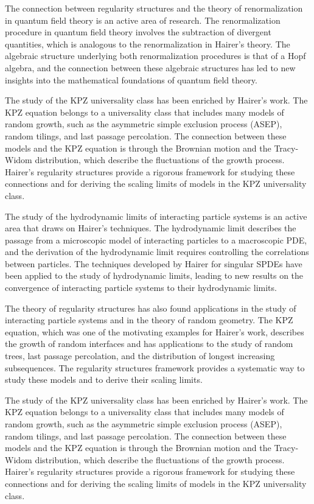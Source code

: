 The connection between regularity structures and the theory of renormalization in quantum field theory is an active area of research. The renormalization procedure in quantum field theory involves the subtraction of divergent quantities, which is analogous to the renormalization in Hairer's theory. The algebraic structure underlying both renormalization procedures is that of a Hopf algebra, and the connection between these algebraic structures has led to new insights into the mathematical foundations of quantum field theory.

The study of the KPZ universality class has been enriched by Hairer's work. The KPZ equation belongs to a universality class that includes many models of random growth, such as the asymmetric simple exclusion process (ASEP), random tilings, and last passage percolation. The connection between these models and the KPZ equation is through the Brownian motion and the Tracy-Widom distribution, which describe the fluctuations of the growth process. Hairer's regularity structures provide a rigorous framework for studying these connections and for deriving the scaling limits of models in the KPZ universality class.

The study of the hydrodynamic limits of interacting particle systems is an active area that draws on Hairer's techniques. The hydrodynamic limit describes the passage from a microscopic model of interacting particles to a macroscopic PDE, and the derivation of the hydrodynamic limit requires controlling the correlations between particles. The techniques developed by Hairer for singular SPDEs have been applied to the study of hydrodynamic limits, leading to new results on the convergence of interacting particle systems to their hydrodynamic limits.

The theory of regularity structures has also found applications in the study of interacting particle systems and in the theory of random geometry. The KPZ equation, which was one of the motivating examples for Hairer's work, describes the growth of random interfaces and has applications to the study of random trees, last passage percolation, and the distribution of longest increasing subsequences. The regularity structures framework provides a systematic way to study these models and to derive their scaling limits.

The study of the KPZ universality class has been enriched by Hairer's work. The KPZ equation belongs to a universality class that includes many models of random growth, such as the asymmetric simple exclusion process (ASEP), random tilings, and last passage percolation. The connection between these models and the KPZ equation is through the Brownian motion and the Tracy-Widom distribution, which describe the fluctuations of the growth process. Hairer's regularity structures provide a rigorous framework for studying these connections and for deriving the scaling limits of models in the KPZ universality class.

